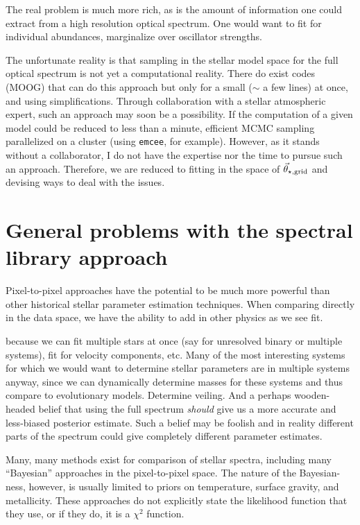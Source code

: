 \documentclass[preprint]{aastex} %
\newcommand{\vt}{\vec{\theta}}
\newcommand{\vg}{\vt_{\star, {\rm grid}}}
\begin{document}
The real problem is much more rich, as is the amount of information one could extract from a high resolution optical spectrum. One would want to fit for individual abundances, marginalize over oscillator strengths. 

The unfortunate reality is that sampling in the stellar model space for the full optical spectrum is not yet a computational reality. There do exist codes (MOOG) that can do this approach but only for a small ($\sim$ a few lines) at once, and using simplifications. Through collaboration with a stellar atmospheric expert, such an approach may soon be a possibility. If the computation of a given model could be reduced to less than a minute, efficient MCMC sampling parallelized on a cluster (using \texttt{emcee}, for example). However, as it stands without a collaborator, I do not have the expertise nor the time to pursue such an approach. Therefore, we are reduced to fitting in the space of $\vg$ and devising ways to deal with the issues.



\section{General problems with the spectral library approach}

Pixel-to-pixel approaches have the potential to be much more powerful than other historical stellar parameter estimation techniques. When comparing directly in the data space, we have the ability to add in other physics as we see fit. 

because we can fit multiple stars at once (say for unresolved binary or multiple systems), fit for velocity components, etc. Many of the most interesting systems for which we would want to determine stellar parameters are in multiple systems anyway, since we can dynamically determine masses for these systems and thus compare to evolutionary models. Determine veiling. And a perhaps wooden-headed belief that using the full spectrum \emph{should} give us a more accurate and less-biased posterior estimate. Such a belief may be foolish and in reality different parts of the spectrum could give completely different parameter estimates.

Many, many methods exist for comparison of stellar spectra, including many ``Bayesian'' approaches in the pixel-to-pixel space. The nature of the Bayesian-ness, however, is usually limited to priors on temperature, surface gravity, and metallicity. These approaches do not explicitly state the likelihood function that they use, or if they do, it is a $\chi^2$ function. 
\end{document}
